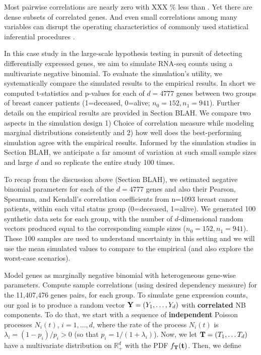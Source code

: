 \documentclass[
]{article}
\begin{document}
Most pairwise correlations are nearly zero with XXX \% less than \textbar. Yet there are dense subsets of correlated genes. And even small correlations among many variables can disrupt the operating characteristics of commonly used statistical inferential procedures \cite{Schissler2018}.

In this case study in the large-scale hypothesis testing in pursuit of detecting differentially expressed genes, we aim to simulate RNA-seq counts using a multivariate negative binomial. To evaluate the simulation's utility, we systematically compare the simulated results to the empirical results. In short we computed t-statistics and p-values for each of \(d=4777\) genes between two groups of breast cancer patients (1=deceased, 0=alive; \(n_0 = 152, n_1=941\)). Further details on the empirical results are provided in Section BLAH. We compare two aspects in the simulation design 1) Choice of correlation measure while modeling marginal distributions consistently and 2) how well does the best-performing simulation agree with the empirical results. Informed by the simulation studies in Section BLAH, we anticipate a far amount of variation at such small sample sizes and large \(d\) and so replicate the entire study 100 times.

To recap from the discussion above (Section BLAH), we estimated negative binomial parameters for each of the \(d=4777\) genes and also their Pearson, Spearman, and Kendall's correlation coefficients from n=1093 breast cancer patients, within each vital status group (0=deceased, 1=alive). We generated 100 synthetic data sets for each group, with the number of \(d\)-dimensional random vectors produced equal to the corresponding sample sizes (\(n_0 = 152, n_1=941\)). These 100 samples are used to understand uncertainty in this setting and we will use the mean simulated values to compare to the empirical (and also explore the worst-case scenarios).

Model genes as marginally negative binomial with heterogeneous gene-wise parameters. Compute sample correlations (using desired dependency measure) for the 11,407,476 genes pairs, for each group. To simulate gene expression counts, our goal is to produce a random vector \({\bf Y}=(Y_1, \ldots, Y_d)\) with \textbf{correlated} NB components. To do that, we start with a sequence of \textbf{independent} Poisson processes \(N_i(t)\), \(i=1,\ldots,d\), where the rate of the process \(N_i(t)\) is \(\lambda_i=(1-p_i)/p_i>0\) (so that \(p_i=1/(1+\lambda_i)\)). Now, we let \({\bf T} = (T_1, \ldots T_d)\) have a multivariate distribution on \(\mathbb R_+^d\) with the PDF \(f_{{\bf T}}({\bf t})\). Then, we define
\end{document}
